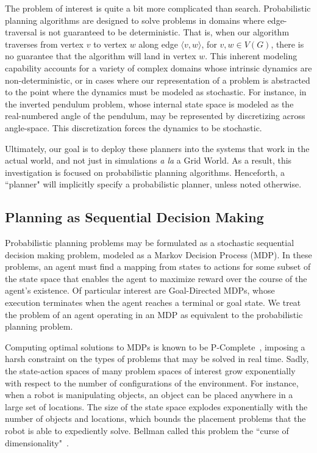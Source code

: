 \documentclass[11pt]{article}
\begin{document}
The problem of interest is quite a bit more complicated than search. Probabilistic planning algorithms are designed to solve problems in domains where edge-traversal is not guaranteed to be deterministic. That is, when our algorithm traverses from vertex $v$ to vertex $w$ along edge $\langle v,w \rangle$, for $v, w \in V(G)$, there is no guarantee that the algorithm will land in vertex $w$. This inherent modeling capability accounts for a variety of complex domains whose intrinsic dynamics are non-deterministic, or in cases where our representation of a problem is abstracted to the point where the dynamics must be modeled as stochastic. For instance, in the inverted pendulum problem, whose internal state space is modeled as the real-numbered angle of the pendulum, may be represented by discretizing across angle-space. This discretization forces the dynamics to be stochastic.

Ultimately, our goal is to deploy these planners into the systems that work in the actual world, and not just in simulations {\it a la} a Grid World. As a result, this investigation is focused on probabilistic planning algorithms. Henceforth, a ``planner" will implicitly specify a probabilistic planner, unless noted otherwise.

\subsection{Planning as Sequential Decision Making}
Probabilistic planning problems may be formulated as a stochastic sequential decision making problem, modeled as a Markov Decision Process (MDP). In these problems, an agent must find a mapping from states to actions for some subset of the state space that enables the agent to maximize reward over the course of the agent's existence. Of particular interest are Goal-Directed MDPs, whose execution terminates when the agent reaches a terminal or goal state. We treat the problem of an agent operating in an MDP as equivalent to the probabilistic planning problem.

Computing optimal solutions to MDPs is known to be P-Complete~\cite{littman1995complexity}, imposing a harsh constraint on the types of problems that may be solved in real time. Sadly, the state-action spaces of many problem spaces of interest grow exponentially with respect to the number of configurations of the environment.  For instance, when a robot is manipulating objects, an object can be placed anywhere in a large set of locations.  The size of the state space explodes exponentially with the number of objects and locations, which bounds the placement problems that the robot is able to expediently solve. Bellman called this problem the ``curse of dimensionality"~\cite{bellman1961adaptive}.
\end{document}
